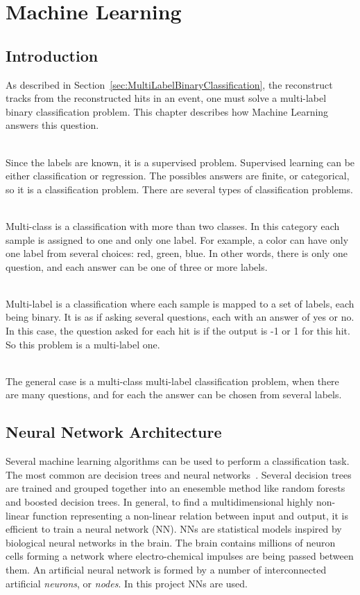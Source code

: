 \chapter{Machine Learning}
\label{chapter:MachineLearning}

\section{Introduction}

As described in Section~\ref{sec:MultiLabelBinaryClassification}, the reconstruct tracks from the reconstructed hits in an event, one must solve a multi-label binary classification problem. This chapter describes how Machine Learning answers this question.

\ \\Since the labels are known, it is a supervised problem. Supervised learning can be either classification or regression. The possibles answers are finite, or categorical, so it is a classification problem. There are several types of classification problems. 

\ \\Multi-class is a classification with more than two classes. In this category each sample is assigned to one and only one label. For example, a color can have only one label from several choices: red, green, blue. In other words, there is only one question, and each answer can be one of three or more labels.

\ \\Multi-label is a classification where each sample is mapped to a set of labels, each being binary. It is as if asking several questions, each with an answer of yes or no. In this case, the question asked for each hit is if the output is -1 or 1 for this hit. So this problem is a multi-label one. 

\ \\The general case is a multi-class multi-label classification problem, when there are many questions, and for each the answer can be chosen from several labels. 

\section{Neural Network Architecture}

Several machine learning algorithms can be used to perform a classification task. The most common are decision trees and neural networks~\cite{AndrewNg}. Several decision trees are trained and grouped together into an enesemble method like random forests and boosted decision trees. In general, to find a multidimensional highly non-linear function representing a non-linear relation between input and output, it is efficient to train a neural network (NN). NNs are statistical models inspired by biological neural networks in the brain. The brain contains millions of neuron cells forming a network where electro-chemical impulses are being passed between them. An artificial neural network is formed by a number of interconnected artificial \emph{neurons}, or \emph{nodes}. In this project NNs are used.


